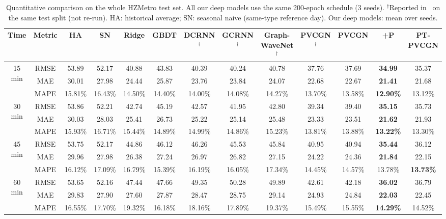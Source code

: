 \begin{table}[t]
\centering
\caption{Quantitative comparison on the whole HZMetro test set. All our deep models use the same 200-epoch schedule (3 seeds). $^\dagger$Reported in~\cite{liu2022pvcgn} on the same test split (not re-run). HA: historical average; SN: seasonal naive (same-type reference day). Our deep models: mean over seeds.}
\label{tab:hz-whole}
\scriptsize
\setlength{\tabcolsep}{3.2pt}
\begin{tabular}{cc|cccc|cccc|ccc}
\toprule
Time & Metric & HA & SN & Ridge & GBDT & DCRNN$^\dagger$ & GCRNN$^\dagger$ & Graph-WaveNet$^\dagger$ & PVCGN$^\dagger$ & PVCGN & +P & PT-PVCGN \\
\midrule
\multirow{3}{*}{15 min} & RMSE & 53.89 & 52.17 & 40.88 & 43.83 & 40.39 & 40.24 & 40.78 & 37.76 & 37.69 & \textbf{34.99} & 35.37 \\
 & MAE & 30.01 & 27.98 & 24.44 & 25.87 & 23.76 & 23.84 & 24.07 & 22.68 & 22.67 & \textbf{21.41} & 21.68 \\
 & MAPE & 15.81\% & 16.43\% & 14.50\% & 14.40\% & 14.00\% & 14.08\% & 14.27\% & 13.70\% & 13.58\% & \textbf{12.90\%} & 13.12\% \\
\midrule
\multirow{3}{*}{30 min} & RMSE & 53.86 & 52.21 & 42.74 & 45.19 & 42.57 & 41.95 & 42.80 & 39.34 & 39.40 & \textbf{35.15} & 35.73 \\
 & MAE & 30.03 & 28.03 & 25.41 & 26.73 & 25.22 & 25.14 & 25.48 & 23.33 & 23.51 & \textbf{21.62} & 21.93 \\
 & MAPE & 15.93\% & 16.71\% & 15.44\% & 14.89\% & 14.99\% & 14.86\% & 15.23\% & 13.81\% & 13.88\% & \textbf{13.22\%} & 13.30\% \\
\midrule
\multirow{3}{*}{45 min} & RMSE & 53.75 & 52.17 & 44.86 & 46.12 & 46.26 & 45.53 & 45.84 & 40.95 & 40.94 & \textbf{35.44} & 36.12 \\
 & MAE & 29.96 & 27.98 & 26.38 & 27.24 & 26.97 & 26.82 & 27.15 & 24.22 & 24.36 & \textbf{21.84} & 22.15 \\
 & MAPE & 16.12\% & 17.09\% & 16.79\% & 15.39\% & 16.19\% & 16.05\% & 17.34\% & 14.45\% & 14.57\% & 13.78\% & \textbf{13.73\%} \\
\midrule
\multirow{3}{*}{60 min} & RMSE & 53.65 & 52.16 & 47.44 & 47.66 & 49.35 & 50.28 & 49.89 & 42.61 & 42.18 & \textbf{36.02} & 36.79 \\
 & MAE & 29.83 & 27.90 & 27.60 & 27.87 & 28.47 & 28.75 & 29.14 & 24.93 & 24.84 & \textbf{22.03} & 22.45 \\
 & MAPE & 16.55\% & 17.70\% & 19.32\% & 16.18\% & 18.16\% & 17.89\% & 19.37\% & 15.49\% & 15.55\% & \textbf{14.29\%} & 14.52\% \\
\bottomrule
\end{tabular}
\end{table}